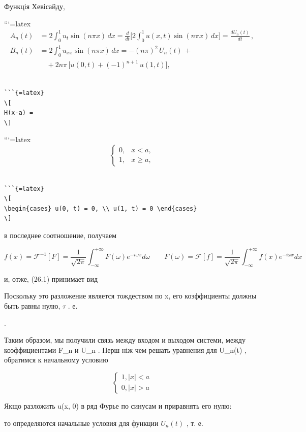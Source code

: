 \documentclass[
]{article}
\begin{document}
Функція Хевісайду,

```{=latex}
\[
\begin{split} A_n(t) &= 2\int_0^1 u_t \sin(n\pi x) \, dx = \frac{d}{dt} \bigg[ 2\int_0^1 u(x, t) \sin(n\pi x) \, dx \bigg] = \frac{dU_n(t)}{dt} \,, \\ B_n(t) &= 2\int_0^1 u_{xx} \sin(n\pi x) \, dx = -(n\pi)^2 \, U_n(t) \,+ \\ &\quad + 2n\pi \, \big[ u(0, t) + (-1)^{n+1} \, u(1, t) \big], \end{split}
\]

\begin{verbatim}

```{=latex}
\[
H(x-a) =
\]
\end{verbatim}

```{=latex}
\[
\begin{cases} 0, & x < a, \\ 1, & x \geqslant a, \end{cases}
\]

\begin{verbatim}

```{=latex}
\[
\begin{cases} u(0, t) = 0, \\ u(1, t) = 0 \end{cases}
\]
\end{verbatim}

в последнее соотношение, получаем

\[
f(x) = \mathcal{F}^{-1}[F] = \frac{1}{\sqrt{2\pi}} \int_{-\infty}^{+\infty} F(\omega) e^{-i\omega x} d\omega \qquad F(\omega) = \mathcal{F}[f] = \frac{1}{\sqrt{2\pi}} \int_{-\infty}^{+\infty} f(x) e^{-i\omega x} dx
\]

и, отже, (26.1) принимает вид

Поскольку это разложение является тождеством по x, его коэффициенты
должны быть равны нулю, \(\tau\) . е.

.

Таким образом, мы получили связь между входом и выходом системи, между
коэффициентами F\_n и U\_n . Перш ніж чем решать уравнения для U\_n(t) ,
обратимся к начальному условию

\[
\begin{cases} 1, |x| < a \\ 0, |x| > a \end{cases}
\]

Якщо разложить u(x, 0) в ряд Фурье по синусам и приравнять его нулю:

то определяются начальные условия для функции \(U_n\left(t\right)\) , т.
е.
\end{document}

